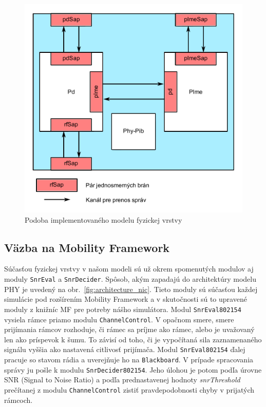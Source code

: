 \begin{figure}[htbp]
\begin{center}
\includegraphics[width=120mm]{figures/architecture_phy}
\caption{Podoba implementovaného modelu fyzickej vrstvy}
\label{fig:architecture_phy}
\end{center}
\end{figure}

\subsection{Väzba na Mobility Framework}
\indent\indent Súčasťou fyzickej vrstvy v našom modeli sú už okrem spomenutých modulov aj moduly \texttt{SnrEval} a \texttt{SnrDecider}. Spôsob, akým zapadajú do architektúry modelu PHY je uvedený na obr.~\ref{fig:architecture_nic}. Tieto moduly sú súčasťou každej simulácie pod rozšírením Mobility Framework a v skutočnosti sú to upravené moduly z knižníc MF pre potreby nášho simulátora. Modul \texttt{SnrEval802154} vysiela rámce priamo modulu \texttt{ChannelControl}. V opačnom smere, smere prijímania rámcov rozhoduje, či rámec sa príjme ako rámec, alebo je uvažovaný len ako príspevok k šumu. To závisí od toho, či je vypočítaná sila zaznamenaného signálu vyššia ako nastavená citlivosť prijímača. Modul \texttt{SnrEval802154} ďalej pracuje so stavom rádia a uverejňuje ho na \texttt{Blackboard}. V prípade spracovania správy ju pošle k modulu \texttt{SnrDecider802154}. Jeho úlohou je potom podľa úrovne SNR (Signal to Noise Ratio) a podľa prednastavenej hodnoty \textit{snrThreshold} prečítanej z modulu \texttt{ChannelControl} zistiť pravdepodobnosti chyby v prijatých rámcoch.\\


